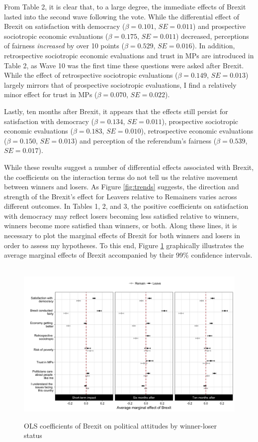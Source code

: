 \documentclass[12pt, letter]{article}
\begin{document}
From Table 2, it is clear that, to a large degree, the immediate effects of Brexit lasted into the second wave following the vote. While the differential effect of Brexit on satisfaction with democracy ($\beta = 0.101$, $SE = 0.011$) and prospective sociotropic economic evaluations ($\beta = 0.175$, $SE = 0.011$) decreased, perceptions of fairness \textit{increased} by over 10 points ($\beta = 0.529$, $SE = 0.016$). In addition, retrospective sociotropic economic evaluations and trust in MPs are introduced in Table 2, as Wave 10 was the first time these questions were asked after Brexit. While the effect of retrospective sociotropic evaluations ($\beta = 0.149$, $SE = 0.013$) largely mirrors that of prospective sociotropic evaluations, I find a relatively minor effect for trust in MPs ($\beta = 0.070$, $SE = 0.022$). 

Lastly, ten months after Brexit, it appears that the effects still persist for satisfaction with democracy ($\beta = 0.134$, $SE = 0.011$), prospective sociotropic economic evaluations ($\beta = 0.183$, $SE = 0.010$), retrospective economic evaluations ($\beta = 0.150$, $SE = 0.013$) and perception of the referendum's fairness ($\beta = 0.539$, $SE = 0.017$). 

While these results suggest a number of differential effects associated with Brexit, the coefficients on the interaction terms do not tell us the relative movement between winners and losers. As Figure \ref{fig:trends} suggests, the direction and strength of the Brexit's effect for Leavers relative to Remainers varies across different outcomes. In Tables 1, 2, and 3, the positive coefficients on satisfaction with democracy may reflect losers becoming less satisfied relative to winners, winners become more satisfied than winners, or both. Along these lines, it is necessary to plot the marginal effects of Brexit for both winners and losers in order to assess my hypotheses. To this end, Figure \ref{fig:marg} graphically illustrates the average marginal effects of Brexit accompanied by their 99\% confidence intervals. 

\begin{figure}[t]
\caption{OLS coefficients of Brexit on political attitudes by winner-loser status}
\hbox{\hspace{-0.5cm} \includegraphics[scale=0.18]{brexit_interactions_all.png}}
\label{fig:marg}
\end{figure}
\end{document}
